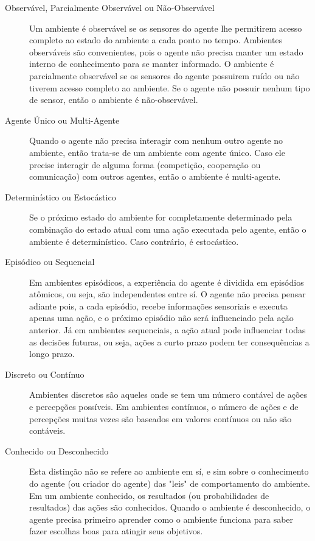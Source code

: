 \begin{description}
	\item[Observável, Parcialmente Observável ou Não-Observável]
		Um ambiente é observável se os sensores do agente lhe permitirem acesso
		completo ao estado do ambiente a cada ponto no tempo. Ambientes
		observáveis são convenientes, pois o agente não precisa manter um estado
		interno de conhecimento para se manter informado. O ambiente é
		parcialmente observável se os sensores do agente possuirem ruído ou não
		tiverem acesso completo ao ambiente. Se o agente não possuir nenhum tipo
		de sensor, então o ambiente é não-observável.

	\item[Agente Único ou Multi-Agente]
		Quando o agente não precisa interagir com nenhum outro agente no
		ambiente, então trata-se de um ambiente com agente único. Caso ele
		precise interagir de alguma forma (competição, cooperação ou
		comunicação) com outros agentes, então o ambiente é multi-agente.

	\item[Determinístico ou Estocástico]
		Se o próximo estado do ambiente for completamente determinado pela
		combinação do estado atual com uma ação executada pelo agente, então o
		ambiente é determinístico. Caso contrário, é estocástico.

	\item[Episódico ou Sequencial]
		Em ambientes episódicos, a experiência do agente é dividida em episódios
		atômicos, ou seja, são independentes entre sí. O agente não precisa
		pensar adiante pois, a cada episódio, recebe informações sensoriais e
		executa apenas uma ação, e o próximo episódio não será influenciado pela
		ação anterior. Já em ambientes sequenciais, a ação atual pode
		influenciar todas as decisões futuras, ou seja, ações a curto prazo
		podem ter consequências a longo prazo.

	\item[Discreto ou Contínuo]
		Ambientes discretos são aqueles onde se tem um número contável de ações
		e percepções possíveis. Em ambientes contínuos, o número de ações e de
		percepções muitas vezes são baseados em valores contínuos ou não são
		contáveis.

	\item[Conhecido ou Desconhecido]
		Esta distinção não se refere ao ambiente em sí, e sim sobre o
		conhecimento do agente (ou criador do agente) das "leis" de
		comportamento do ambiente. Em um ambiente conhecido, os resultados (ou
		probabilidades de resultados) das ações são conhecidos. Quando o
		ambiente é desconhecido, o agente precisa primeiro aprender como o
		ambiente funciona para saber fazer escolhas boas para atingir seus
		objetivos.
\end{description}



